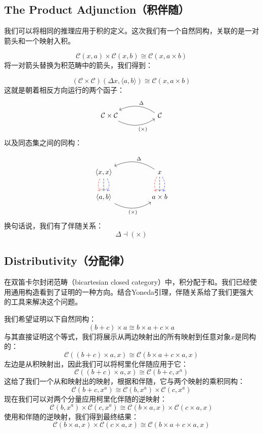 \documentclass[DaoFP]{subfiles}
\begin{document}
    \subsection{The Product Adjunction（积伴随）}

    我们可以将相同的推理应用于积的定义。这次我们有一个自然同构，关联的是一对箭头和一个映射入积。

    \[  \mathcal{C} (x, a) \times \mathcal{C}(x, b) \cong  \mathcal{C} (x, a \times b)  \]
    将一对箭头替换为积范畴中的箭头，我们得到：

    \[  (\mathcal{C} \times \mathcal{C})( \Delta x,  \langle a, b \rangle ) \cong  \mathcal{C} (x, a \times b)  \]
    这就是朝着相反方向运行的两个函子：
    \[
        \begin{tikzcd}
            \mathcal{C} \times \mathcal{C}
            \arrow[rr, bend right, "(\times)"']
            &&
            \mathcal{C}
            \arrow[ll, bend right, "\Delta"']
        \end{tikzcd}
    \]
    以及同态集之间的同构：

    \[
        \begin{tikzcd}
            \langle x, x \rangle
            \arrow[d, bend right, red, dashed]
            \arrow[d, dashed]
            \arrow[d, bend left, blue, dashed]
            &&
            x
            \arrow[d, bend right, red, dashed]
            \arrow[d, dashed]
            \arrow[d, bend left, blue, dashed]
            \arrow[ll, bend right, "\Delta"']
            \\
            \langle a , b \rangle
            \arrow[rr, bend right, "(\times)"']
            &&
            a \times b
        \end{tikzcd}
    \]
    换句话说，我们有了伴随关系：
    \[ \Delta \dashv (\times) \]

    \subsection{Distributivity（分配律）}

    在双笛卡尔封闭范畴（bicartesian closed category）中，积分配于和。我们已经使用通用构造看到了证明的一种方向。结合Yoneda引理，伴随关系给了我们更强大的工具来解决这个问题。

    我们希望证明以下自然同构：
    \[(b + c) \times a \cong b \times a + c \times a \]
    与其直接证明这个等式，我们将展示从两边映射出的所有映射到任意对象$x$是同构的：
    \[  \mathcal{C} ((b + c) \times a, x) \cong \mathcal{C}(b \times a + c \times a, x) \]
    左边是从积映射出，因此我们可以将柯里化伴随应用于它：
    \[  \mathcal{C} ((b + c) \times a, x) \cong \mathcal{C}(b + c, x^a) \]
    这给了我们一个从和映射出的映射，根据和伴随，它与两个映射的乘积同构：
    \[  \mathcal{C}(b + c, x^a) \cong \mathcal{C}(b, x^a) \times \mathcal{C}(c, x^a)\]
    现在我们可以对两个分量应用柯里化伴随的逆映射：
    \[  \mathcal{C}(b, x^a) \times \mathcal{C}(c, x^a) \cong \mathcal{C}(b \times a, x) \times \mathcal{C}(c \times a, x)\]
    使用和伴随的逆映射，我们得到最终结果：
    \[ \mathcal{C}(b \times a, x) \times \mathcal{C}(c \times a, x) \cong \mathcal{C}(b \times a + c \times a, x) \]
\end{document}
